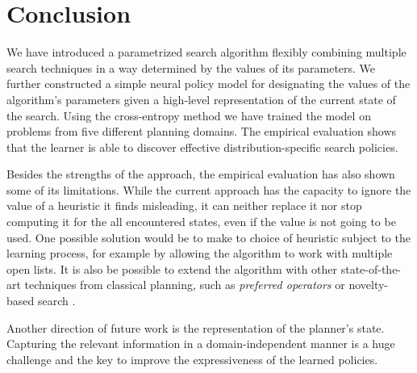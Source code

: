 \documentclass[letterpaper]{article} %
\begin{document}
\section{Conclusion}

We have introduced a parametrized search algorithm flexibly combining multiple search techniques in a way determined by the values of its parameters. We further constructed a simple neural policy model for designating the values of the algorithm's parameters given a high-level representation of the current state of the search. Using the cross-entropy method we have trained the model on problems from five different planning domains. The empirical evaluation shows that the learner is able to discover effective distribution-specific search policies.

Besides the strengths of the approach, the empirical evaluation has also shown some of its limitations. While the current approach has the capacity to ignore the value of a heuristic it finds misleading, it can neither replace it nor stop computing it for the all encountered states, even if the value is not going to be used. One possible solution would be to make to choice of heuristic subject to the learning process, for example by allowing the algorithm to work with multiple open lists. It is also be possible to extend the algorithm with other state-of-the-art techniques from classical planning, such as \emph{preferred operators} or novelty-based search \cite{Lipovetzky2017}.

Another direction of future work is the representation of the planner's state. Capturing the relevant information in a domain-independent manner is a huge challenge and the key to improve the expressiveness of the learned policies.



\end{document}
